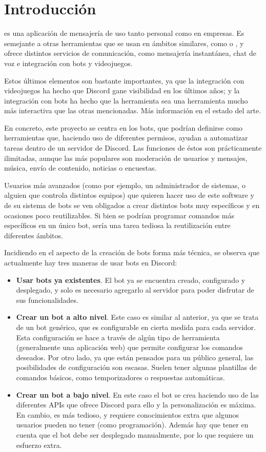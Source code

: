 \chapter{Introducción}

\cite{discord} es una aplicación de mensajería de uso tanto personal como en empresas. Es semejante a otras herramientas que se usan en ámbitos similares, como \cite{slack} o \cite{teamspeak}, y ofrece distintos servicios de comunicación, como mensajería instantánea, chat de voz e integración con bots y videojuegos.

Estos últimos elementos son bastante importantes, ya que la integración con videojuegos ha hecho que Discord gane visibilidad en los últimos años; y la integración con bots ha hecho que la herramienta sea una herramienta mucho más interactiva que las otras mencionadas. Más información en el estado del arte.

En concreto, este proyecto se centra en los bots, que podrían definirse como herramientas que, haciendo uso de diferentes permisos, ayudan a automatizar tareas dentro de un servidor de Discord. Las funciones de éstos son prácticamente ilimitadas, aunque las más populares son moderación de usuarios y mensajes, música, envío de contenido, noticias o encuestas.

\bigskip

Usuarios más avanzados (como por ejemplo, un administrador de sistemas, o alguien que controla distintos equipos) que quieren hacer uso de este software y de su sistema de bots se ven obligados a crear distintos bots muy específicos y en ocasiones poco reutilizables. Si bien se podrían programar comandos más específicos en un único bot, sería una tarea tediosa la reutilización entre diferentes ámbitos.

Incidiendo en el aspecto de la creación de bots forma más técnica, se observa que actualmente hay tres maneras de usar bots en Discord:

\begin{itemize}
	\item \textbf{Usar bots ya existentes}. El bot ya se encuentra creado, configurado y desplegado, y solo es necesario agregarlo al servidor para poder disfrutar de sus funcionalidades.
	\item \textbf{Crear un bot a alto nivel}. Este caso es similar al anterior, ya que se trata de un bot genérico, que es configurable en cierta medida para cada servidor. Esta configuración se hace a través de algún tipo de herramienta (generalmente una aplicación web) que permite configurar los comandos deseados. Por otro lado, ya que están pensados para un público general, las posibilidades de configuración son escasas. Suelen tener algunas plantillas de comandos básicos, como temporizadores o respuestas automáticas.
	\item \textbf{Crear un bot a bajo nivel}. En este caso el bot se crea haciendo uso de las diferentes APIs que ofrece Discord para ello y la personalización es máxima. En cambio, es más tedioso, y requiere conocimientos extra que algunos usuarios pueden no tener (como programación). Además hay que tener en cuenta que el bot debe ser desplegado manualmente, por lo que requiere un esfuerzo extra.
\end{itemize}

